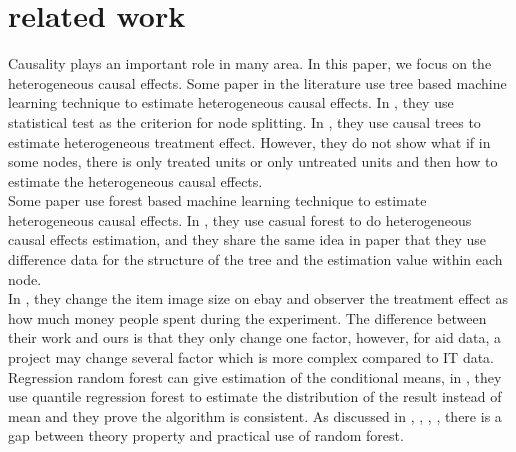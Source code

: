 \section{related work}
Causality \cite{Pearl:2000:CMR:331969} plays an important role in many area. In this paper, we focus on the heterogeneous causal effects.
Some paper in the literature use tree based machine learning technique to estimate heterogeneous causal effects.
In \cite{journals/jmlr/SuTWNL09}, they use statistical test as the criterion for node splitting.  In \cite{1504.01132}, they use causal trees to estimate heterogeneous treatment effect. However, they do not show what if in some nodes, there is only treated units or only untreated units and then how to estimate the heterogeneous causal effects.\\
Some paper use forest based machine learning technique to estimate heterogeneous causal effects. In \cite{1510.04342}, they use casual forest to do heterogeneous causal effects estimation, and they share the same idea in paper \cite{Denil:2014} that they use difference data for the structure of the tree and the estimation value within each node.\\
In \cite{1412.8563}, they change the item image size on ebay and observer the treatment effect as how much money people spent during the experiment. The difference between their work and ours is that they only change one factor, however, for aid data, a project may change several factor which is more complex compared to IT data. 
\cite{hirano2003efficient}
Regression random forest can give estimation of the conditional means, in \cite{Meinshausen:2006:QRF:1248547.1248582}, they use quantile regression  forest to estimate the distribution of the result instead of mean and they prove the algorithm is consistent. 
As discussed in  \cite{Biau:2012:ARF:2503308.2343682}, \cite{Wager:2014:CIR:2627435.2638587}, , \cite{Denil:2014}, there is a gap between theory property and practical use of random forest. 